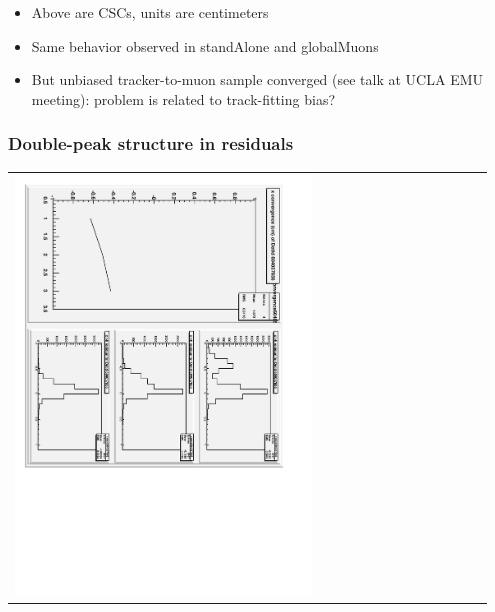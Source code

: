 \documentclass[compress]{beamer}
\begin{document}
\begin{frame}
\vfill
\begin{itemize}
\item Above are CSCs, units are centimeters

\item Same behavior observed in standAlone and globalMuons

\item But unbiased tracker-to-muon sample converged (see talk at UCLA
  EMU meeting): problem is related to track-fitting bias?
\end{itemize}
\end{frame}

\begin{frame}
\frametitle{Double-peak structure in residuals}
\begin{tabular}{p{0.65\linewidth} c p{0.3\linewidth}}
\begin{minipage}{\linewidth}
  \vspace{-0.25 cm}
  \includegraphics[height=\linewidth, angle=90]{sometimes-trusted_chamber2.pdf}


\end{minipage}
\end{tabular}
\end{frame}
\end{document}
